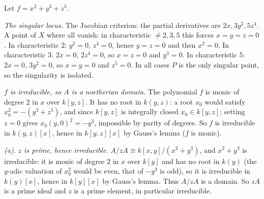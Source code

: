 \documentclass[11pt]{article}
\begin{document}
\pf
Let $f=x^2+y^3+z^5$.

\emph{The singular locus.} The Jacobian criterion: the partial derivatives are $2x,3y^2,5z^4$. A point of $X$ where all vanish: in characteristic $\ne2,3,5$ this forces $x=y=z=0$. In characteristic $2$: $y^2=0$, $z^4=0$, hence $y=z=0$ and then $x^2=0$. In characteristic $3$: $2x=0$, $2z^4=0$, so $x=z=0$ and $y^3=0$. In characteristic $5$: $2x=0$, $3y^2=0$, so $x=y=0$ and $z^5=0$. In all cases $P$ is the only singular point, so the singularity is isolated.

\emph{$f$ is irreducible, so $A$ is a noetherian domain.} The polynomial $f$ is monic of degree $2$ in $x$ over $k[y,z]$. It has no root in $k(y,z)$: a root $x_0$ would satisfy $x_0^2=-(y^3+z^5)$, and since $k[y,z]$ is integrally closed $x_0\in k[y,z]$; setting $z=0$ gives $x_0(y,0)^2=-y^3$, impossible by parity of degrees. So $f$ is irreducible in $k(y,z)[x]$, hence in $k[y,z][x]$ by Gauss's lemma ($f$ is monic).

\emph{(a).} \emph{$z$ is prime, hence irreducible.} $A/zA\cong k[x,y]/(x^2+y^3)$, and $x^2+y^3$ is irreducible: it is monic of degree $2$ in $x$ over $k[y]$ and has no root in $k(y)$ (the $y$-adic valuation of $x_0^2$ would be even, that of $-y^3$ is odd), so it is irreducible in $k(y)[x]$, hence in $k[y][x]$ by Gauss's lemma. Thus $A/zA$ is a domain. So $zA$ is a prime ideal and $z$ is a prime element, in particular irreducible.
\end{document}
